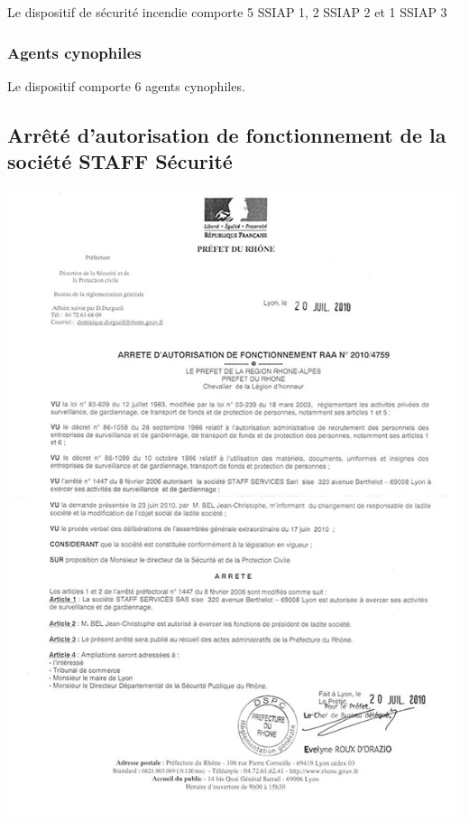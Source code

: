\documentclass[hidelinks, paper=a4, fontsize=13pt]{report}
\begin{document}
Le dispositif de sécurité incendie comporte 5 SSIAP 1, 2 SSIAP 2  et 1 SSIAP 3

\subsubsection{Agents cynophiles}

Le dispositif comporte 6 agents cynophiles.

\subsection{Arrêté d’autorisation de fonctionnement de la société STAFF Sécurité}

\begin{center}
	\includegraphics[scale=0.70]{Annexes/Documents/ArreteSTAFF}
\end{center}
\end{document}
